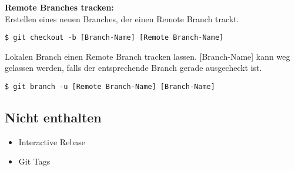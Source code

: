 \documentclass[a4paper,8pt,landscape,twocolumn]{scrartcl}
\begin{document}
\begin{orangeBox}
\textbf{Remote Branches tracken:}
\\
Erstellen eines neuen Branches, der einen Remote Branch trackt.
\begin{lstlisting}[style=bash]
$ git checkout -b [Branch-Name] [Remote Branch-Name]
\end{lstlisting}
Lokalen Branch einen Remote Branch tracken lassen. [Branch-Name] kann weg gelassen werden, falls der entsprechende Branch gerade ausgecheckt ist.
\begin{lstlisting}[style=bash]
$ git branch -u [Remote Branch-Name] [Branch-Name]
\end{lstlisting}
\end{orangeBox}

\subsection{Nicht enthalten}
\begin{itemize}
\item Interactive Rebase
\item Git Tags
\end{itemize}
\end{document}
